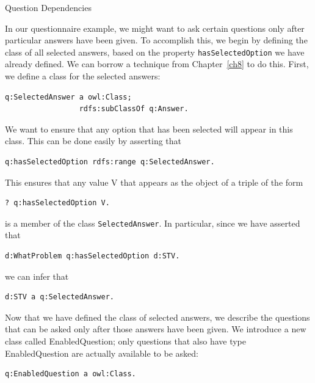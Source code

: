 \begin{example}{Question Dependencies}

In our questionnaire example, we might want to ask certain questions
only after particular answers have been given. To accomplish this, we
begin by defining the class of all selected answers, based on the
property \texttt{hasSelectedOption} we have already defined. We can borrow a
technique from Chapter~\ref{ch8} to do this. First, we define a class for the
selected answers:

\begin{lstlisting}
q:SelectedAnswer a owl:Class;
                 rdfs:subClassOf q:Answer.
\end{lstlisting}

We want to ensure that any option that has been selected will appear in
this class. This can be done easily by asserting that

\begin{lstlisting}
q:hasSelectedOption rdfs:range q:SelectedAnswer.
\end{lstlisting}

This ensures that any value V that appears as the object of a triple of
the form

\begin{lstlisting}
? q:hasSelectedOption V.
\end{lstlisting}

is a member of the class \texttt{SelectedAnswer}. In particular, since we have
asserted that

\begin{lstlisting}
d:WhatProblem q:hasSelectedOption d:STV.
\end{lstlisting}

we can infer that

\begin{lstlisting}
d:STV a q:SelectedAnswer.
\end{lstlisting}

\end{example}

Now that we have defined the class of selected answers, we describe the
questions that can be asked only after those answers have been given. We
introduce a new class called EnabledQuestion; only questions that also
have type EnabledQuestion are actually available to be asked:

\begin{lstlisting}
q:EnabledQuestion a owl:Class.
\end{lstlisting}

